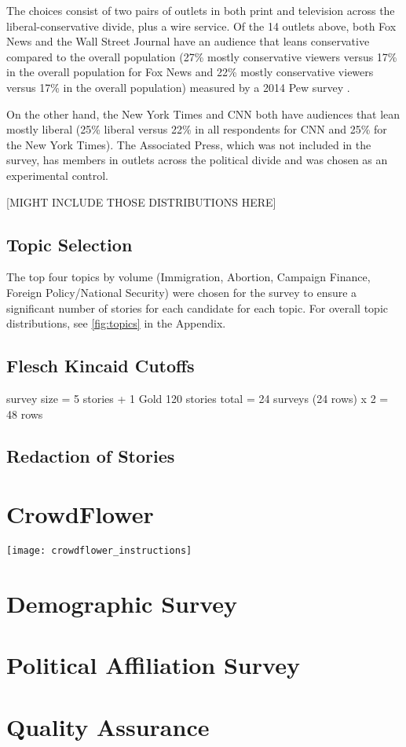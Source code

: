 The choices consist of two pairs of outlets in both print and television across the liberal-conservative divide, plus a wire service. Of the 14 outlets above, both Fox News and the Wall Street Journal have an audience that leans conservative compared to the overall population (27\% mostly conservative viewers versus 17\% in the overall population for Fox News and 22\% mostly conservative viewers versus 17\% in the overall population) measured by a 2014 Pew survey \cite{PoliticalPolarization}.

On the other hand, the New York Times and CNN both have audiences that lean mostly liberal (25\% liberal versus 22\% in all respondents for CNN and 25\% for the New York Times). The Associated Press, which was not included in the survey, has members in outlets across the political divide and was chosen as an experimental control. 

[MIGHT INCLUDE THOSE DISTRIBUTIONS HERE]

\subsection {Topic Selection}

The top four topics by volume (Immigration, Abortion, Campaign Finance, Foreign Policy/National Security) were chosen for the survey to ensure a significant number of stories for each candidate for each topic. For overall topic distributions, see \ref{fig:topics} in the Appendix.
 




\subsection {Flesch Kincaid Cutoffs}

survey size = 5 stories + 1 Gold
120 stories total = 24 surveys (24 rows)
x 2 = 48 rows


\subsection {Redaction of Stories}

 

\section{CrowdFlower}

\texttt{[image: crowdflower\_instructions]}
 
\section{Demographic Survey}
\section{Political Affiliation Survey}
\section{Quality Assurance}
